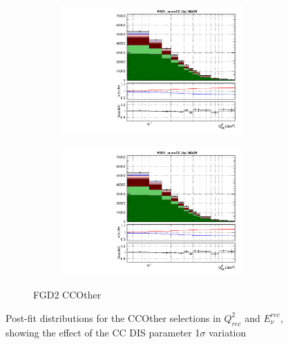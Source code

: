 \begin{figure}[h]
\begin{subfigure}[t]{\textwidth}
\begin{subfigure}[t]{0.49\textwidth}
	\includegraphics[width=\textwidth, trim={0mm 0mm 0mm 6mm}, clip,page=219]{figures/mach3/data/postfit/2017b_NewData_NewDet_UpdXsecStep_2Xsec_4Det_5Flux_0_PostFit_5_4_rootstack}
\end{subfigure}
\begin{subfigure}[t]{0.49\textwidth}
	\includegraphics[width=\textwidth, trim={0mm 0mm 0mm 6mm}, clip,page=220]{figures/mach3/data/postfit/2017b_NewData_NewDet_UpdXsecStep_2Xsec_4Det_5Flux_0_PostFit_5_4_rootstack}
\end{subfigure}
\caption{FGD2 CCOther}
\end{subfigure}
	\caption{Post-fit distributions for the CCOther selections in $Q^2_{rec}$ and $E_\nu^{rec}$, showing the effect of the CC DIS parameter 1$\sigma$ variation}
	\label{fig:postfit_q2enu_data_ccother}
\end{figure}

